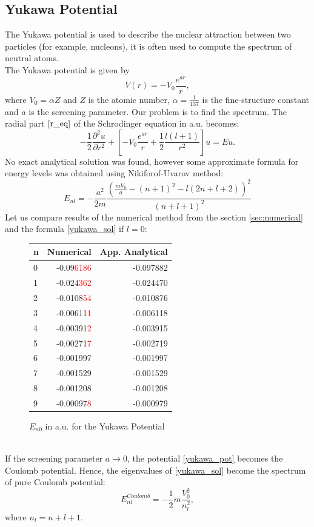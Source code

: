\documentclass[a4paper, 12pt]{article}
\begin{document}
\subsection{Yukawa Potential}
The Yukawa potential is used to  describe the nuclear attraction between two particles (for example, nucleons), it is often used to compute the spectrum of neutral atoms.\\ 
The Yukawa potential is given by
\begin{equation} \label{yukawa_pot}
V(r) = -V_0\frac{e^{a r}}{r},
\end{equation}
where $V_0 = \alpha Z$ and $Z$ is the atomic number, $\alpha = \frac{1}{137}$ is the fine-structure constant and $a$ is the screening parameter.
Our problem is to find the spectrum. The radial part $\eqref{r_eq}$ of the Schrodinger equation in a.u. becomes:
$$-\frac{1}{2}\frac{\partial^2 u}{\partial r^2}+[-V_0\frac{e^{a r}}{r} +\frac{1}{2}\frac{l(l+1)}{r^2}]u = Eu.$$
No exact analytical solution was found, however some approximate formula for energy levels was obtained using Nikiforof-Uvarov method: 
\begin{equation}\label{yukawa_sol}
E_{nl} = -\frac{a^2}{2m}\frac{(\displaystyle{\frac{m V_0}{a}} - (n+1)^2 - l(2n+l+2))^2}{(n+l+1)^2}
\end{equation}
Let us compare results of the numerical method from the section \ref{sec:numerical} and the formula \eqref{yukawa_sol} if $l = 0$:
\begin{figure}[h!]
	\centering
	\begin{tabular}{lrr}
		\toprule
		{n} &  Numerical   &         App. Analytical \\
		\midrule
		0 & -0.09\textcolor{red}{6186} & -0.097882 \\
		1 & -0.024\textcolor{red}{362} & -0.024470 \\
		2 & -0.0108\textcolor{red}{54} & -0.010876 \\
		3 & -0.00611\textcolor{red}{1} & -0.006118 \\
		4 & -0.00391\textcolor{red}{2} & -0.003915 \\
		5 & -0.00271\textcolor{red}{7} & -0.002719 \\
		6 & -0.001997 & -0.001997 \\
		7 & -0.001529 & -0.001529 \\
		8 & -0.001208 & -0.001208 \\
		9 & -0.00097\textcolor{red}{8} & -0.000979 \\
		\bottomrule
	\end{tabular}
	\caption{$E_{n0}$ in a.u. for the Yukawa Potential}
\end{figure}\\
If the screening parameter $ a\to 0$, the potential \eqref{yukawa_pot} becomes the Coulomb potential. Hence, the eigenvalues of \eqref{yukawa_sol} become the spectrum of pure Coulomb potential:
$$E_{nl}^{Coulomb} = -\frac{1}{2} m \frac{V_0^2}{n_l^2},$$
where $n_l = n+l+1.$
\end{document}
